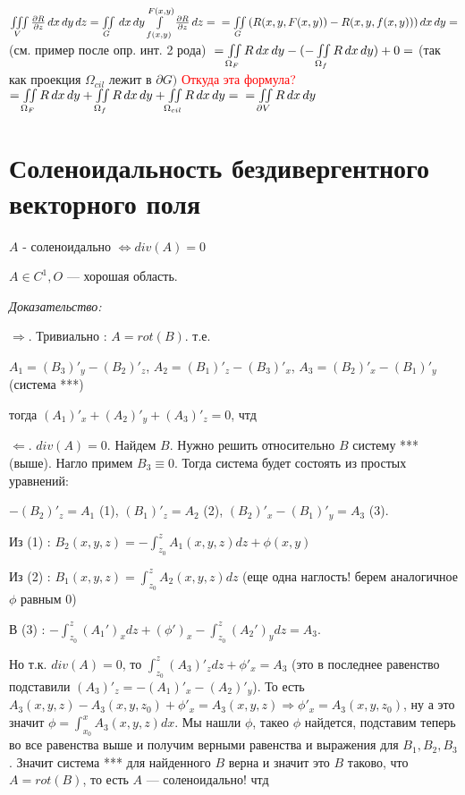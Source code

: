 \documentclass[paper=a4, fontsize=14pt]{report}
\begin{document}
$\iiint\limits_{V}{\frac {\partial R}{\partial z} \,dx\,dy\,dz}
= \iint\limits_G\,dx\,dy\int\limits_{f(x,y)}^{F(x,y)} {\frac {\partial R}{\partial z} \,dz} = \\
= \iint\limits_G{(R(x,y, F(x,y)) - R(x, y, f(x,y)))\,dx\,dy} = $ (см. пример после опр. инт. 2 рода) $\\
= \iint\limits_{\Omega_F}{R\,dx\,dy} - (-\iint\limits_{\Omega_f}{R\,dx\,dy}) + 0  = $ (так как проекция $\Omega_{cil}$ лежит в $\partial G )$ \textcolor{red}{Откуда эта формула?}\\
$= \iint\limits_{\Omega_F}{R\,dx\,dy} + \iint\limits_{\Omega_f}{R\,dx\,dy} + \iint\limits_{\Omega_{cil}}{R\,dx\,dy} = \\
= \iint\limits_{\partial V}{R\,dx\,dy}$


    \section{Соленоидальность бездивергентного векторного поля}

    $A$ - соленоидально $ \Leftrightarrow div(A) = 0 $

    $A \in C^1, O $ --- хорошая область.
    
    
    \emph{Доказательство:}

$\Rightarrow $. Тривиально : $A = rot(B)$. т.е. 

$A_1 = (B_3)'_y - (B_2)'_z$, $A_2 = (B_1)'_z - (B_3)'_x$, $A_3 = (B_2)'_x - (B_1)'_y$ (система ***)

тогда $(A_1)'_x + (A_2)'_y + (A_3)'_z = 0$, чтд

$\Leftarrow $. $div(A) = 0$. Найдем $B$. Нужно решить относительно $B$ систему *** (выше). Нагло примем $B_3 \equiv 0$. Тогда система будет состоять из простых уравнений:

$-(B_2)'_z = A_1$ (1), $(B_1)'_z = A_2$ (2), $(B_2)'_x - (B_1)'_y = A_3$ (3). 

Из (1) : $B_2(x, y, z) = - \int_{z_0}^{z} A_1(x, y, z)dz + \phi(x, y)$

Из (2) : $B_1(x, y, z) = \int_{z_0}^{z} A_2(x, y, z)dz$ (еще одна наглость! берем аналогичное $\phi$ равным $0$)

В (3) : $- \int_{z_0}^{z} (A_{1}')_{x} dz + (\phi')_x - \int_{z_0}^{z} (A_{2}')_{y} dz = A_3$.

Но т.к. $div(A) = 0$, то $\int_{z_0}^{z} (A_3)'_z dz + \phi'_x = A_3$ (это в последнее равенство подставили $(A_3)'_z = -(A_1)'_x - (A_2)'_y$). То есть $A_3(x, y, z) - A_3(x, y, z_0) + \phi'_x = A_3(x, y, z) \Rightarrow \phi'_x = A_3(x, y, z_0)$, ну а это значит $\phi = \int_{x_0}^{x} A_3(x, y, z)dx$. Мы нашли $\phi$, такео $\phi$ найдется, подставим теперь во все равенства выше и получим верными равенства и выражения для $B_1, B_2, B_3$. Значит система *** для найденного $B$ верна и значит это $B$ таково, что $A = rot(B)$, то есть $A$ --- соленоидально! чтд
\end{document}
